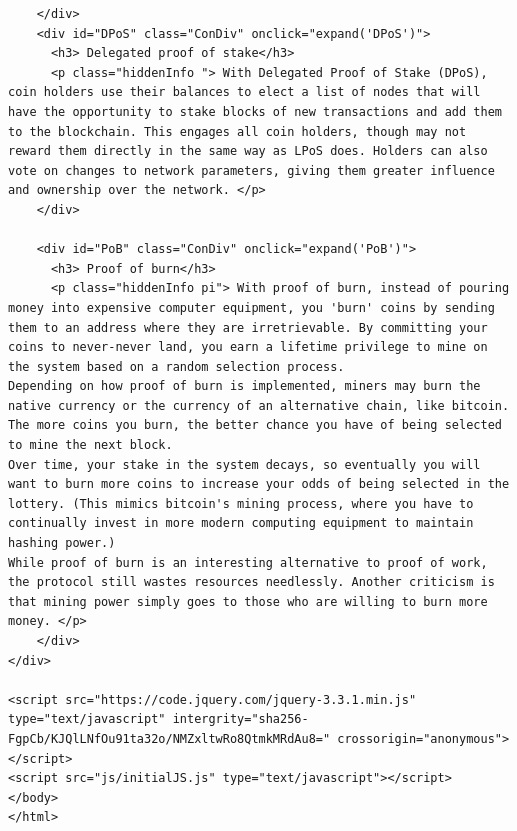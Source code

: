 \begin{lstlisting}
    </div>
    <div id="DPoS" class="ConDiv" onclick="expand('DPoS')">
      <h3> Delegated proof of stake</h3>
      <p class="hiddenInfo "> With Delegated Proof of Stake (DPoS), coin holders use their balances to elect a list of nodes that will have the opportunity to stake blocks of new transactions and add them to the blockchain. This engages all coin holders, though may not reward them directly in the same way as LPoS does. Holders can also vote on changes to network parameters, giving them greater influence and ownership over the network. </p>
    </div>

    <div id="PoB" class="ConDiv" onclick="expand('PoB')">
      <h3> Proof of burn</h3>
      <p class="hiddenInfo pi"> With proof of burn, instead of pouring money into expensive computer equipment, you 'burn' coins by sending them to an address where they are irretrievable. By committing your coins to never-never land, you earn a lifetime privilege to mine on the system based on a random selection process.
Depending on how proof of burn is implemented, miners may burn the native currency or the currency of an alternative chain, like bitcoin. The more coins you burn, the better chance you have of being selected to mine the next block.
Over time, your stake in the system decays, so eventually you will want to burn more coins to increase your odds of being selected in the lottery. (This mimics bitcoin's mining process, where you have to continually invest in more modern computing equipment to maintain hashing power.)
While proof of burn is an interesting alternative to proof of work, the protocol still wastes resources needlessly. Another criticism is that mining power simply goes to those who are willing to burn more money. </p>
    </div>
</div>

<script src="https://code.jquery.com/jquery-3.3.1.min.js" type="text/javascript" intergrity="sha256-FgpCb/KJQlLNfOu91ta32o/NMZxltwRo8QtmkMRdAu8=" crossorigin="anonymous"></script>
<script src="js/initialJS.js" type="text/javascript"></script>
</body>
</html>

\end{lstlisting}

